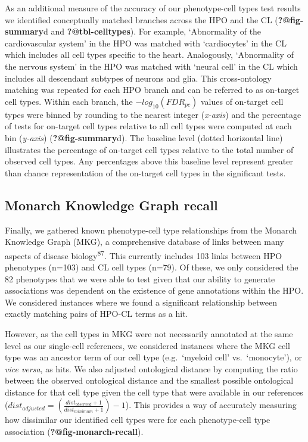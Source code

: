 \documentclass[
]{report}
\begin{document}
As an additional measure of the accuracy of our phenotype-cell types
test results we identified conceptually matched branches across the HPO
and the CL (\textbf{?@fig-summary}d and \textbf{?@tbl-celltypes}). For
example, `Abnormality of the cardiovascular system' in the HPO was
matched with `cardiocytes' in the CL which includes all cell types
specific to the heart. Analogously, `Abnormality of the nervous system'
in the HPO was matched with `neural cell' in the CL which includes all
descendant subtypes of neurons and glia. This cross-ontology matching
was repeated for each HPO branch and can be referred to as on-target
cell types. Within each branch, the \(-log_{10}(FDR _{pc})\) values of
on-target cell types were binned by rounding to the nearest integer
(\emph{x-axis}) and the percentage of tests for on-target cell types
relative to all cell types were computed at each bin (\emph{y-axis})
(\textbf{?@fig-summary}d). The baseline level (dotted horizontal line)
illustrates the percentage of on-target cell types relative to the total
number of observed cell types. Any percentages above this baseline level
represent greater than chance representation of the on-target cell types
in the significant tests.

\subsection{Monarch Knowledge Graph
recall}\label{monarch-knowledge-graph-recall-1}

Finally, we gathered known phenotype-cell type relationships from the
Monarch Knowledge Graph (MKG), a comprehensive database of links between
many aspects of disease biology\textsuperscript{87}. This currently
includes 103 links between HPO phenotypes (n=103) and CL cell types
(n=79). Of these, we only considered the 82 phenotypes that we were able
to test given that our ability to generate associations was dependent on
the existence of gene annotations within the HPO. We considered
instances where we found a significant relationship between exactly
matching pairs of HPO-CL terms as a hit.

However, as the cell types in MKG were not necessarily annotated at the
same level as our single-cell references, we considered instances where
the MKG cell type was an ancestor term of our cell type (e.g.~`myeloid
cell' vs.~`monocyte'), or \emph{vice versa}, as hits. We also adjusted
ontological distance by computing the ratio between the observed
ontological distance and the smallest possible ontological distance for
that cell type given the cell type that were available in our references
(\(dist_{adjusted}=(\frac{dist_{observed}+1}{dist_{minimum}+1})-1\)).
This provides a way of accurately measuring how dissimilar our
identified cell types were for each phenotype-cell type association
(\textbf{?@fig-monarch-recall}).
\end{document}
